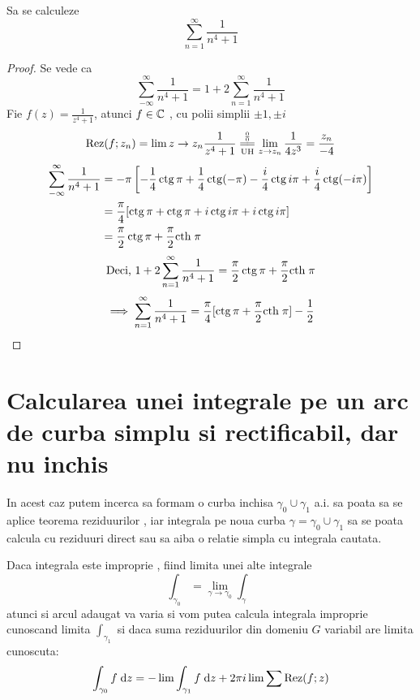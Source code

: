 \begin{aplicatie}
    Sa se calculeze \[ \sum_{n=1}^{\infty} \frac{1}{n^4 + 1}\]
    \begin{proof}
        Se vede ca
        \[
            \sum_{-\infty}^{\infty} \frac{1}{n^4 + 1} = 1 + 2 \sum_{n=1}^{\infty} \frac{1}{n^4 + 1}
        \]
        Fie $\displaystyle f(z) = \frac{1}{z^4+1}$, atunci $f\in \mathcal{\mathbb{C}}$ , cu polii simplii $\pm 1, \pm i$
        \[
            \Rez(f;z_n) = \lim{z \to z_n} \frac{1}{z^4+1}
                \EqConformCaz \lim_{z \to z_n} \frac{1}{4z^3}
                =\frac{z_n}{-4}
        \]
        \begin{align*}
          \sum_{-\infty}^{\infty} \frac{1}{n^4 + 1}
            &= - \pi \left[-\frac{1}{4} \operatorname{ctg} \pi + \frac{1}{4} \operatorname{ctg}(-\pi)
              - \frac{i}{4} \operatorname{ctg} i\pi + \frac{i}{4}\operatorname{ctg}(-i\pi)\right] \\
            &= \frac{\pi}{4}[\operatorname{ctg} \pi + \operatorname{ctg} \pi + i\operatorname{ctg} i\pi + i\operatorname{ctg} i\pi] \\
            &= \frac{\pi}{2} \operatorname{ctg} \pi + \frac{\pi}{2} \mathrm{cth}\; \pi
        \end{align*}
        \[
            \text{Deci, } 1 + 2 \sum_{n=1}^{\infty} \frac{1}{n^4 + 1}
                = \frac{\pi}{2} \operatorname{ctg} \pi + \frac{\pi}{2} \mathrm{cth}\; \pi
        \]
        \[
            \implies \sum_{n=1}^{\infty} \frac{1}{n^4 + 1}
                = \frac{\pi}{4} [\operatorname{ctg} \pi + \frac{\pi}{2} \mathrm{cth}\; \pi ] - \frac{1}{2}
        \]

    \end{proof}
\end{aplicatie}

\section{Calcularea unei integrale pe un arc de curba simplu si rectificabil, dar nu inchis}

    In acest caz putem incerca sa formam o curba inchisa $\gamma_0 \cup \gamma_1$
    a.i. sa poata sa se aplice teorema reziduurilor , iar integrala pe noua curba
    $\gamma=\gamma_0 \cup \gamma_1$ sa se poata calcula cu
    reziduuri direct sau sa aiba o relatie simpla cu integrala cautata.

    Daca integrala este improprie , fiind limita unei alte integrale
    \[
        \int_{\gamma_0}= \lim_{\gamma \to \gamma_0} \int_{\gamma}
    \]
    atunci si arcul adaugat va varia si vom putea calcula integrala improprie
    cunoscand limita $\int_{\gamma_1}$ si daca  suma reziduurilor din domeniu $G$
    variabil are limita cunoscuta:
    \[
        \int_{\gamma_0} f \; \mathrm{d} z = - \lim \int_{\gamma_1} f \; \mathrm{d} z + 2 \pi i \lim \sum \operatorname{Rez} (f;z)
    \]

